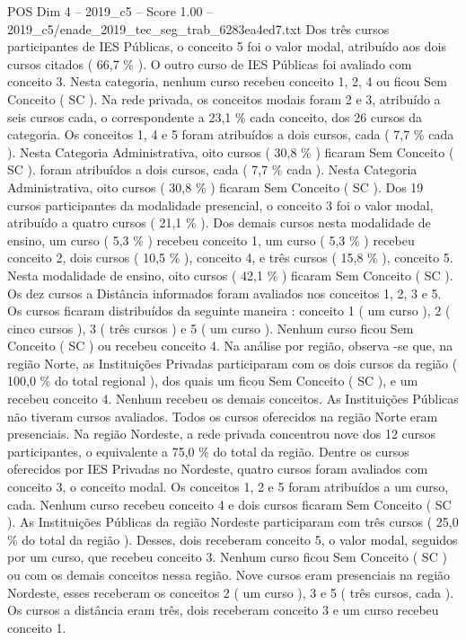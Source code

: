 \begin{textsample}{POS Dim 4 – 2019\_c5 – Score 1.00 – 2019\_c5/enade\_2019\_tec\_seg\_trab\_6283ea4ed7.txt}
Dos três cursos participantes de IES Públicas, o conceito 5 foi o valor modal, atribuído aos dois cursos citados ( 66,7 \% ).
O outro curso de IES Públicas foi avaliado com conceito 3.
Nesta categoria, nenhum curso recebeu conceito 1, 2, 4 ou ficou Sem Conceito ( SC ).
Na rede privada, os conceitos modais foram 2 e 3, atribuído a seis cursos cada, o correspondente a 23,1 \% cada conceito, dos 26 cursos da categoria.
Os conceitos 1, 4 e 5 foram atribuídos a dois cursos, cada ( 7,7 \% cada ).
Nesta Categoria Administrativa, oito cursos ( 30,8 \% ) ficaram Sem Conceito ( SC ). foram atribuídos a dois cursos, cada ( 7,7 \% cada ).
Nesta Categoria Administrativa, oito cursos ( 30,8 \% ) ficaram Sem Conceito ( SC ).
Dos 19 cursos participantes da modalidade presencial, o conceito 3 foi o valor modal, atribuído a quatro cursos ( 21,1 \% ).
Dos demais cursos nesta modalidade de ensino, um curso ( 5,3 \% ) recebeu conceito 1, um curso ( 5,3 \% ) recebeu conceito 2, dois cursos ( 10,5 \% ), conceito 4, e três cursos ( 15,8 \% ), conceito 5.
Nesta modalidade de ensino, oito cursos ( 42,1 \% ) ficaram Sem Conceito ( SC ).
Os dez cursos a Distância informados foram avaliados nos conceitos 1, 2, 3 e 5.
Os cursos ficaram distribuídos da seguinte maneira : conceito 1 ( um curso ), 2 ( cinco cursos ), 3 ( três cursos ) e 5 ( um curso ).
Nenhum curso ficou Sem Conceito ( SC ) ou recebeu conceito 4.
Na análise por região, observa -se que, na região Norte, as Instituições Privadas participaram com os dois cursos da região ( 100,0 \% do total regional ), dos quais um ficou Sem Conceito ( SC ), e um recebeu conceito 4.
Nenhum recebeu os demais conceitos.
As Instituições Públicas não tiveram cursos avaliados.
Todos os cursos oferecidos na região Norte eram presenciais.
Na região Nordeste, a rede privada concentrou nove dos 12 cursos participantes, o equivalente a 75,0 \% do total da região.
Dentre os cursos oferecidos por IES Privadas no Nordeste, quatro cursos foram avaliados com conceito 3, o conceito modal.
Os conceitos 1, 2 e 5 foram atribuídos a um curso, cada.
Nenhum curso recebeu conceito 4 e dois cursos ficaram Sem Conceito ( SC ).
As Instituições Públicas da região Nordeste participaram com três cursos ( 25,0 \% do total da região ).
Desses, dois receberam conceito 5, o valor modal, seguidos por um curso, que recebeu conceito 3.
Nenhum curso ficou Sem Conceito ( SC ) ou com os demais conceitos nessa região.
Nove cursos eram presenciais na região Nordeste, esses receberam os conceitos 2 ( um curso ), 3 e 5 ( três cursos, cada ).
Os cursos a distância eram três, dois receberam conceito 3 e um curso recebeu conceito 1.

\end{textsample}
